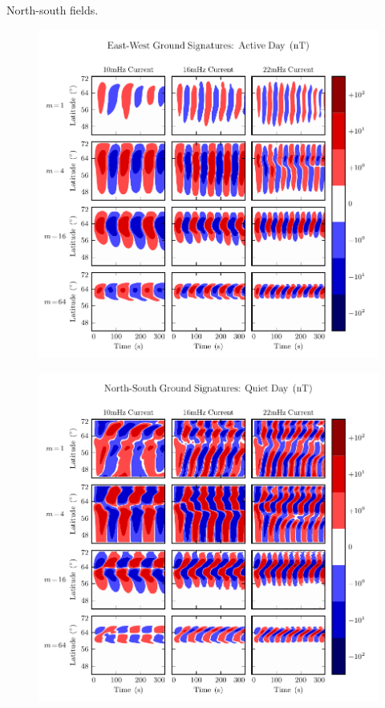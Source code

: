 North-south fields. 

\begin{figure}[H]
    \centering
    \includegraphics[width=\textwidth]{figures/BfE_J_1.pdf}
    \caption[North-South Ground Signatures: Active Day]{}
    \label{fig_BqE_J_1}
\end{figure}

\begin{figure}[H]
    \centering
    \includegraphics[width=\textwidth]{figures/BqE_J_2.pdf}
    \caption[North-South Ground Signatures: Quiet Day]{}
    \label{fig_BqE_J_2}
\end{figure}

